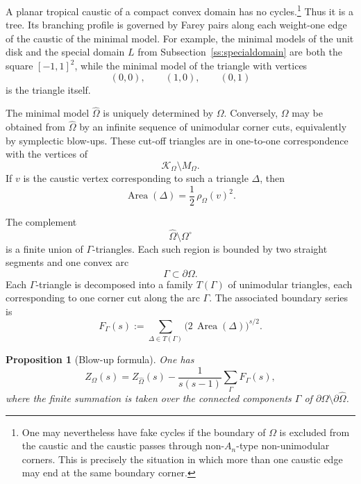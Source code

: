 \documentclass[a4paper,american,11pt]{amsart}
\theoremstyle{plain}
\newtheorem{proposition}[theorem]{Proposition}
\theoremstyle{definition}
\DeclareMathOperator{\Area}{Area}
\begin{document}
A planar tropical caustic of a compact convex domain has no cycles.\footnote{One
may nevertheless have fake cycles if the boundary of \(\Omega\) is excluded
from the caustic and the caustic passes through non-\(A_n\)-type
non-unimodular corners.  This is precisely the situation in which more than
one caustic edge may end at the same boundary corner.}
Thus it is a tree.  Its branching profile is governed by Farey pairs along
each weight-one edge of the caustic of the minimal model.  For example, the
minimal models of the unit disk and the special domain \(L\) from
Subsection~\ref{ss:specialdomain} are both the square \([-1,1]^2\), while the
minimal model of the triangle with vertices
\[
(0,0),\qquad (1,0),\qquad (0,1)
\]
is the triangle itself.

The minimal model \(\widehat\Omega\) is uniquely determined by \(\Omega\).
Conversely, \(\Omega\) may be obtained from \(\widehat\Omega\) by an infinite
sequence of unimodular corner cuts, equivalently by symplectic blow-ups.  These
cut-off triangles are in one-to-one correspondence with the vertices of
\[
\mathcal K_\Omega\setminus M_\Omega.
\]
If \(v\) is the caustic vertex corresponding to such a triangle \(\Delta\),
then
\[
\Area(\Delta)=\frac12\,\rho_\Omega(v)^2.
\]

The complement
\[
\widehat\Omega\setminus\Omega^\circ
\]
is a finite union of \(\Gamma\)-triangles.  Each such region is bounded by two
straight segments and one convex arc
\[
\Gamma\subset\partial\Omega.
\]
Each \(\Gamma\)-triangle is decomposed into a family \(T(\Gamma)\) of
unimodular triangles, each corresponding to one corner cut along the arc
\(\Gamma\).  The associated boundary series is
\[
F_\Gamma(s):=
\sum_{\Delta\in T(\Gamma)}
\bigl(2\,\Area(\Delta)\bigr)^{s/2}.
\]

\begin{proposition}[Blow-up formula]
\label{prop:blowup}
One has
\[
Z_\Omega(s)
=
Z_{\widehat\Omega}(s)
-
\frac{1}{s(s-1)}
\sum_{\Gamma}
F_\Gamma(s),
\]
where the finite summation is taken over the connected components
\(\Gamma\) of \(\partial\Omega\setminus\partial\widehat\Omega\).
\end{proposition}
\end{document}
